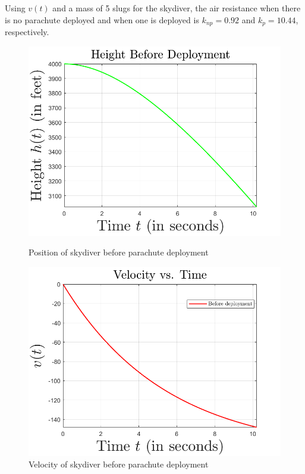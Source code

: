 \documentclass{article}
\begin{document}
    Using $v(t)$ and a mass of 5 slugs for the skydiver, the air resistance when there is no parachute deployed and when one is deployed is $k_{np} = 0.92$ and $k_p = 10.44$, respectively.
    \begin{figure}[h]
        \centering
        \begin{minipage}{0.45\textwidth}
            \includegraphics[scale = 0.35]{positionBeforeDeployment}
            \caption{Position of skydiver before parachute deployment}
        \end{minipage}\hfill
        \begin{minipage}{0.45\textwidth}
            \centering
            \includegraphics[scale = 0.35]{velocityBeforeDeployment}
            \caption{Velocity of skydiver before parachute deployment}
        \end{minipage}
    \end{figure}
\end{document}
